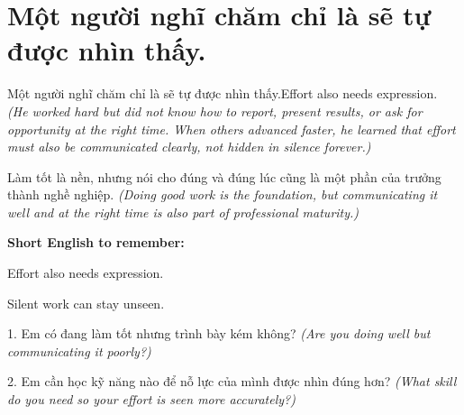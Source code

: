 \section{Một người nghĩ chăm chỉ là sẽ tự được nhìn thấy.}
\begin{truyen}{Một người nghĩ chăm chỉ là sẽ tự được nhìn thấy.}{Effort also needs expression.}
\textit{(He worked hard but did not know how to report, present results, or ask for opportunity at the right time. When others advanced faster, he learned that effort must also be communicated clearly, not hidden in silence forever.)}
\end{truyen}
\begin{baihoc}
Làm tốt là nền, nhưng nói cho đúng và đúng lúc cũng là một phần của trưởng thành nghề nghiệp.
\textit{(Doing good work is the foundation, but communicating it well and at the right time is also part of professional maturity.)}
\end{baihoc}
\begin{ghinhoanh}
\textbf{Short English to remember:}

Effort also needs expression.

Silent work can stay unseen.
\end{ghinhoanh}
\begin{tuhocnhanh}
1. Em có đang làm tốt nhưng trình bày kém không? \textit{(Are you doing well but communicating it poorly?)}

2. Em cần học kỹ năng nào để nỗ lực của mình được nhìn đúng hơn? \textit{(What skill do you need so your effort is seen more accurately?)}
\end{tuhocnhanh}
\ngancach

